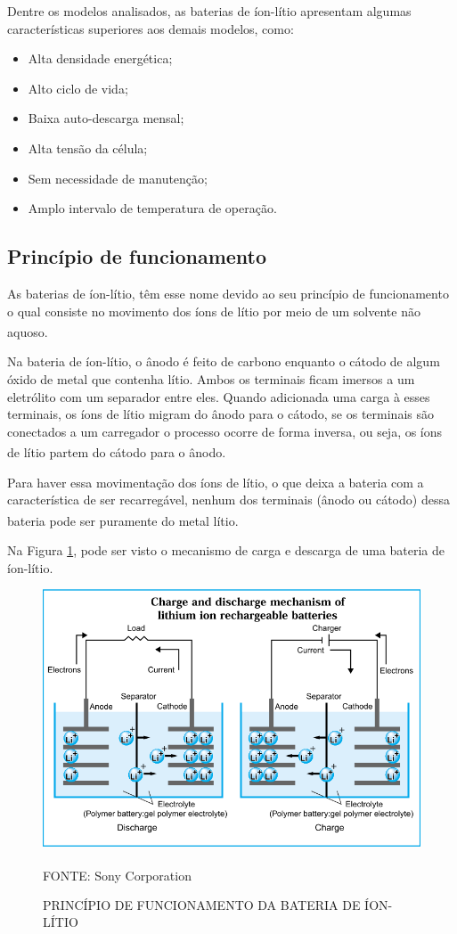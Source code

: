 \documentclass[
	12pt,				%
	openright,			%
	oneside,			%
	a4paper,			%
	english,			%
	french,				%
	spanish,			%
	brazil,				%
	oldfontcommands
	]{abntex2}
\begin{document}
	Dentre os modelos analisados, as baterias de íon-lítio apresentam algumas características superiores aos demais modelos, como:
	\pagebreak
	
	\begin{itemize}
		\item Alta densidade energética;
		\item Alto ciclo de vida;
		\item Baixa auto-descarga mensal;
		\item Alta tensão da célula;
		\item Sem necessidade de manutenção;
		\item Amplo intervalo de temperatura de operação.
	\end{itemize}


\subsection[Princípio de funcionamento]{Princípio de funcionamento}

	
	As baterias de íon-lítio, têm esse nome devido ao seu princípio de funcionamento o qual consiste no movimento dos íons de lítio por meio de um solvente não aquoso.\textsuperscript{\cite{BraEsc}}	
	
	Na bateria de íon-lítio, o ânodo é feito de carbono enquanto o cátodo de algum óxido de metal que contenha lítio. Ambos os terminais ficam imersos a um eletrólito com um separador entre eles. Quando adicionada uma carga à esses terminais, os íons de lítio migram do ânodo para o cátodo, se os terminais são conectados a um carregador o processo ocorre de forma inversa,  ou seja, os íons de lítio partem do cátodo para o ânodo.\textsuperscript{\cite{sony}}
	
	Para haver essa movimentação dos íons de lítio, o que deixa a bateria com a característica de ser recarregável, nenhum dos terminais (ânodo ou cátodo) dessa bateria pode ser puramente do metal lítio.\textsuperscript{\cite{sony}}
	
	Na Figura \ref{Fig_PF_Bat}, pode ser visto o mecanismo de carga e descarga de uma bateria de íon-lítio.
	
	\begin{figure}[th]
		\caption{PRINCÍPIO DE FUNCIONAMENTO DA BATERIA DE ÍON-LÍTIO}
		\label{Fig_PF_Bat}
		\centering
		\includegraphics[width=0.6\linewidth]{./figs/funcionamento_bateria}
			
		\begin{small}
			FONTE: Sony Corporation\textsuperscript{\cite{sony}}
		\end{small}		
	\end{figure}
	\pagebreak
\end{document}
